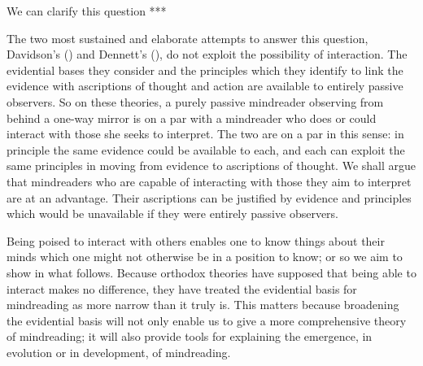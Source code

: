 \documentclass[12pt,letterpaper]{extarticle}
\begin{document}
We can clarify this question ***



The two most sustained and elaborate attempts to answer this question,
Davidson's (\citeyear{Davidson:1984wh}) and Dennett's (\citeyear{Dennett:1987sf}),
do not exploit the possibility of interaction.
The evidential bases they consider and the principles which they identify to link the evidence with ascriptions of thought and action are available to entirely passive observers.
So on these theories,
a purely passive mindreader observing from behind a one-way mirror
is on a par with
a mindreader who does or could interact with those she seeks to interpret.
The two are on a par in this sense:
in principle the same evidence could be available to each, and each can exploit the same principles in moving from evidence to ascriptions of thought.
We shall argue that mindreaders who are capable of interacting with those they aim to interpret are at an advantage.
Their ascriptions can be justified by evidence and principles which would be unavailable if they were entirely passive observers.

Being poised to interact with others enables one to know things about their minds which one might not otherwise be in a position to know; or so we aim to show in what follows.
Because orthodox theories have supposed that being able to interact makes no difference,
they have treated the evidential basis for mindreading as more narrow than it truly is.
This matters because broadening the evidential basis will not only enable us to give a more comprehensive theory of mindreading; 
it will also provide tools for explaining the emergence, in evolution or in development, of mindreading.
\end{document}
